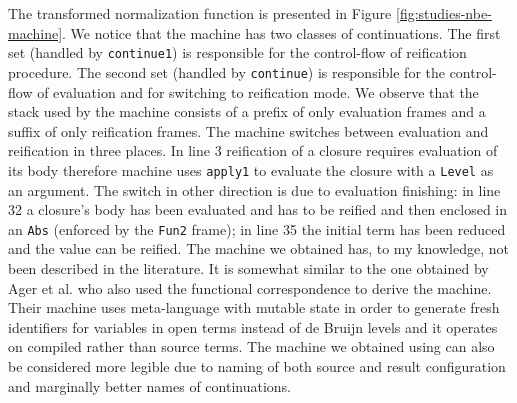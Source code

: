 The transformed normalization function is presented in Figure \ref{fig:studies-nbe-machine}.
We notice that the machine has two classes of continuations.
The first set (handled by \lstinline!continue1!) is responsible for the control-flow of reification procedure.
The second set (handled by \lstinline!continue!) is responsible for the control-flow of evaluation and for switching to reification mode.
We observe that the stack used by the machine consists of a prefix of only evaluation frames and a suffix of only reification frames.
The machine switches between evaluation and reification in three places.
In line 3 reification of a closure requires evaluation of its body therefore machine uses \lstinline!apply1! to evaluate the closure with a \lstinline!Level! as an argument.
The switch in other direction is due to evaluation finishing: in line 32 a closure's body has been evaluated and has to be reified and then enclosed in an \lstinline!Abs! (enforced by the \lstinline!Fun2! frame); in line 35 the initial term has been reduced and the value can be reified.
The machine we obtained has, to my knowledge, not been described in the literature.
It is somewhat similar to the one obtained by Ager et al. \cite{ager-interpreter-compiler} who also used the functional correspondence to derive the machine.
Their machine uses meta-language with mutable state in order to generate fresh identifiers for variables in open terms instead of de Bruijn levels and it operates on compiled rather than source terms.
The machine we obtained using \semt{} can also be considered more legible due to naming of both source and result configuration and marginally better names of continuations.
